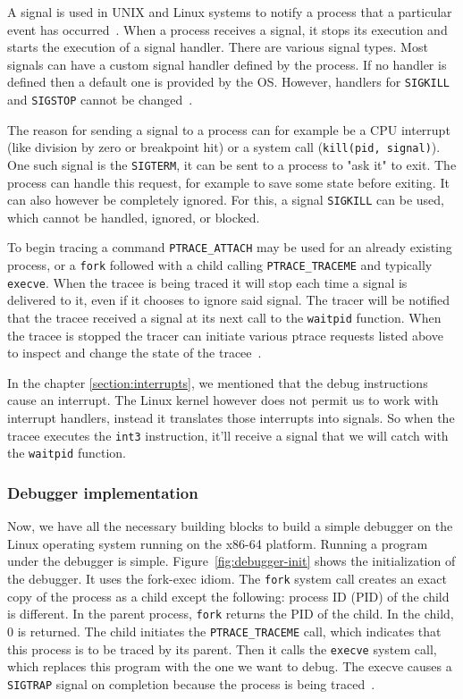 A signal is used in UNIX and Linux systems to notify a process that a
particular event has occurred~\cite{os-concepts}. When a process receives a
signal, it stops its execution and starts the execution of a signal handler.
There are various signal types. Most signals can have a custom signal handler
defined by the process. If no handler is defined then a default one is provided
by the OS. However, handlers for \texttt{SIGKILL} and \texttt{SIGSTOP} cannot
be changed~\cite{signals}.

The reason for sending a signal to a process can for example be a CPU interrupt
(like division by zero or breakpoint hit) or a system call (\texttt{kill(pid,
signal)}). One such signal is the \texttt{SIGTERM}, it can be sent to a process
to "ask it" to exit. The process can handle this request, for example to save
some state before exiting. It can also however be completely ignored. For this,
a signal \texttt{SIGKILL} can be used, which cannot be handled, ignored, or
blocked.

To begin tracing a command \texttt{PTRACE\_ATTACH} may be used for an already
existing process, or a \texttt{fork} followed with a child calling
\texttt{PTRACE\_TRACEME} and typically \texttt{execve}. When the tracee is
being traced it will stop each time a signal is delivered to it, even if it
chooses to ignore said signal. The tracer will be notified that the tracee
received a signal at its next call to the \texttt{waitpid} function. When the
tracee is stopped the tracer can initiate various ptrace requests listed above
to inspect and change the state of the tracee~\cite{ptrace}.

In the chapter \ref{section:interrupts}, we mentioned that the debug
instructions cause an interrupt. The Linux kernel however does not permit us to
work with interrupt handlers, instead it translates those interrupts into
signals. So when the tracee executes the \texttt{int3} instruction, it'll
receive a signal that we will catch with the \texttt{waitpid} function.

\subsubsection{Debugger implementation}
Now, we have all the necessary building blocks to build a simple debugger on
the Linux operating system running on the x86-64 platform. Running a program
under the debugger is simple. Figure~\ref{fig:debugger-init} shows the
initialization of the debugger. It uses the fork-exec idiom. The \texttt{fork}
system call creates an exact copy of the process as a child except the
following: process ID (PID) of the child is different. In the parent process,
\texttt{fork} returns the PID of the child. In the child, $0$ is returned. The
child initiates the \texttt{PTRACE\_TRACEME} call, which indicates that
this process is to be traced by its parent. Then it calls the \texttt{execve}
system call, which replaces this program with the one we want to debug. The
execve causes a \texttt{SIGTRAP} signal on completion because the process is
being traced~\cite{execve}.

